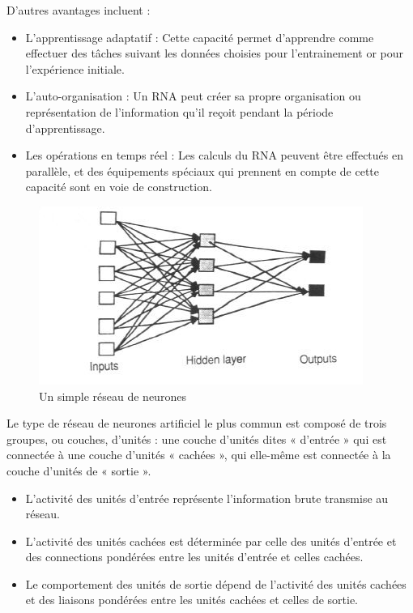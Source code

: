 \documentclass[a4paper, 12pt]{article} %
\begin{document}
D’autres avantages incluent :
\begin{itemize}
	\item L’apprentissage adaptatif : Cette capacité permet d’apprendre comme effectuer des tâches  suivant les données choisies pour l’entrainement or pour l’expérience initiale.
	\item L’auto-organisation : Un RNA peut créer sa propre organisation ou représentation de l’information qu’il reçoit pendant la période d’apprentissage.
	\item Les opérations en temps réel : Les calculs du RNA peuvent être effectués en parallèle, et des équipements spéciaux qui prennent en compte de cette capacité sont en voie de construction.
\end{itemize}

\begin{figure}[!h]%
	\begin{center} 
		\includegraphics[width=0.60\columnwidth]{images/rna.jpg}%
		\caption{Un simple réseau de neurones}%
	\end{center}
\end{figure}

Le type de réseau de neurones artificiel le plus commun est composé de trois groupes, ou couches, d’unités : une couche d’unités dites « d’entrée » qui est connectée à une couche d’unités « cachées », qui elle-même est connectée à la couche d’unités de « sortie ».

\begin{itemize}
	\item L’activité des unités d’entrée représente l’information brute transmise au réseau.
	\item L’activité des unités cachées est déterminée par celle des unités d’entrée et des connections pondérées entre les unités d’entrée et celles cachées.
	\item Le comportement des unités de sortie dépend de l’activité des unités cachées et des liaisons pondérées entre les unités cachées et celles de sortie.
\end{itemize}
\end{document}
